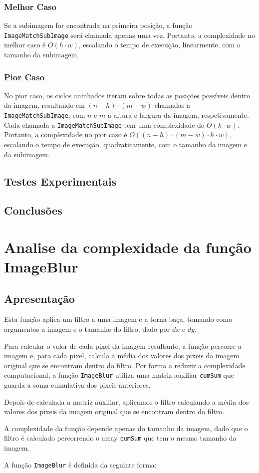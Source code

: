 \documentclass{report}
\begin{document}
\subsubsection{Melhor Caso}
Se a subimagem for encontrada na primeira posição, a função \texttt{ImageMatchSubImage} será chamada apenas uma vez. 
Portanto, a complexidade no melhor caso é \(O(h \cdot w)\), escalando o tempo de execução, linearmente, com o tamanho da subimagem.

\subsubsection{Pior Caso}
No pior caso, os ciclos aninhados iteram sobre todas as posições possíveis dentro da imagem, 
resultando em \((n-h) \cdot (m-w)\) chamadas a \texttt{ImageMatchSubImage}, com \(n\) e \(m\) a altura e largura da imagem, respetivamente. 
Cada chamada a \texttt{ImageMatchSubImage} tem uma complexidade de \(O(h \cdot w)\).
Portanto, a complexidade no pior caso é \(O((n-h) \cdot (m-w) \cdot h \cdot w)\), escalando o tempo de execução, quadraticamente, 
com o tamanho da imagem e da subimagem.

\subsection{Testes Experimentais}


\subsection{Conclusões}


\section{Analise da complexidade da função ImageBlur}

\subsection{Apresentação}
Esta função aplica um filtro a uma imagem e a torna baça, tomando como argumentos a imagem e o tamanho do filtro, dado por \(dx\) e \(dy\).
\par
Para calcular o valor de cada pixel da imagem resultante, a função percorre a imagem e, para cada pixel,
calcula a média dos valores dos pixeis da imagem original que se encontram dentro do filtro. Por forma a reduzir a complexidade computacional,
a função \texttt{ImageBlur} utiliza uma matriz auxiliar \texttt{cumSum} que guarda a soma cumulativa dos pixeis anteriores.
\par
Depois de calculada a matriz auxiliar, aplicamos o filtro calculando a média dos valores dos pixeis da imagem original que se encontram dentro do filtro.
\par
A complexidade da função depende apenas do tamanho da imagem, dado que o filtro é calculado percorrendo o array \texttt{cumSum} 
que tem o mesmo tamanho da imagem.
\par
A função \texttt{ImageBlur} é definida da seguinte forma:
\end{document}
